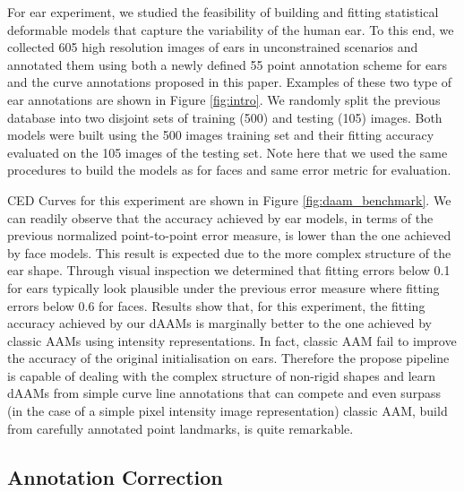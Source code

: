 For ear experiment, we studied the feasibility of building and fitting statistical deformable models that capture the variability of the human ear. To this end, we collected 605 high resolution images of ears in unconstrained scenarios and annotated them using both a newly defined 55 point annotation scheme for ears and the curve annotations proposed in this paper. Examples of these two type of ear annotations are shown in Figure \ref{fig:intro}. We randomly split the previous database into two disjoint sets of training (500) and testing (105) images. Both models were built using the 500 images training set and their fitting accuracy evaluated on the 105 images of the testing set. Note here that we used the same procedures to build the models as for faces and same error metric for evaluation.

CED Curves for this experiment are shown in Figure \ref{fig:daam_benchmark}. We can readily observe that the accuracy achieved by ear models, in terms of the previous normalized point-to-point error measure, is lower than the one achieved by face models. This result is expected due to the more complex structure of the ear shape. Through visual inspection we determined that fitting errors below 0.1 for ears typically look plausible under the previous error measure where fitting errors below 0.6 for faces. Results show that, for this experiment, the fitting accuracy achieved by our dAAMs is marginally better to the one achieved by classic AAMs using intensity representations. In fact, classic AAM fail to improve the accuracy of the original initialisation on ears. Therefore the propose pipeline is capable of dealing with the complex structure of non-rigid shapes and learn dAAMs from simple curve line annotations that can compete and even surpass (in the case of a simple pixel intensity image representation) classic AAM, build from carefully annotated point landmarks, is quite remarkable.

\subsection{Annotation Correction}
\label{exp:qualitative}


